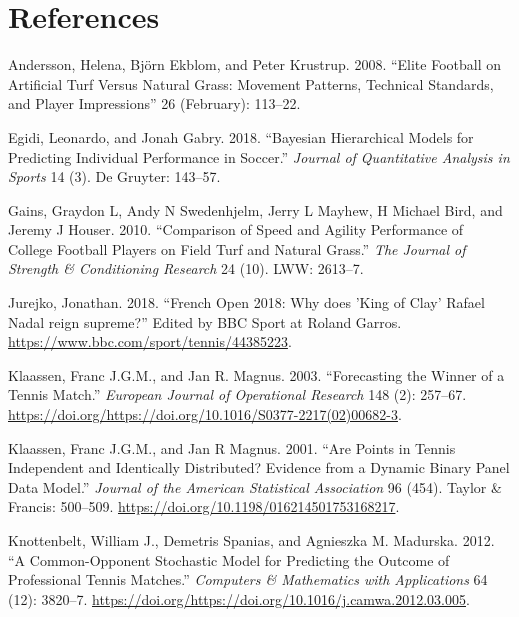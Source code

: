 \documentclass[]{article}
\begin{document}
\hypertarget{sec:refs}{%
\section*{References}\label{sec:refs}}

\hypertarget{refs}{}
\leavevmode\hypertarget{ref-andersson2008}{}%
Andersson, Helena, Björn Ekblom, and Peter Krustrup. 2008. ``Elite
Football on Artificial Turf Versus Natural Grass: Movement Patterns,
Technical Standards, and Player Impressions'' 26 (February): 113--22.

\leavevmode\hypertarget{ref-egidi2018}{}%
Egidi, Leonardo, and Jonah Gabry. 2018. ``Bayesian Hierarchical Models
for Predicting Individual Performance in Soccer.'' \emph{Journal of
Quantitative Analysis in Sports} 14 (3). De Gruyter: 143--57.

\leavevmode\hypertarget{ref-gains2010}{}%
Gains, Graydon L, Andy N Swedenhjelm, Jerry L Mayhew, H Michael Bird,
and Jeremy J Houser. 2010. ``Comparison of Speed and Agility Performance
of College Football Players on Field Turf and Natural Grass.'' \emph{The
Journal of Strength \& Conditioning Research} 24 (10). LWW: 2613--7.

\leavevmode\hypertarget{ref-bbc2018}{}%
Jurejko, Jonathan. 2018. ``French Open 2018: Why does 'King of Clay'
Rafael Nadal reign supreme?'' Edited by BBC Sport at Roland Garros.
\url{https://www.bbc.com/sport/tennis/44385223}.

\leavevmode\hypertarget{ref-klaassen2003}{}%
Klaassen, Franc J.G.M., and Jan R. Magnus. 2003. ``Forecasting the
Winner of a Tennis Match.'' \emph{European Journal of Operational
Research} 148 (2): 257--67.
\url{https://doi.org/https://doi.org/10.1016/S0377-2217(02)00682-3}.

\leavevmode\hypertarget{ref-klaassen2001}{}%
Klaassen, Franc J.G.M., and Jan R Magnus. 2001. ``Are Points in Tennis
Independent and Identically Distributed? Evidence from a Dynamic Binary
Panel Data Model.'' \emph{Journal of the American Statistical
Association} 96 (454). Taylor \& Francis: 500--509.
\url{https://doi.org/10.1198/016214501753168217}.

\leavevmode\hypertarget{ref-knottenbelt2012}{}%
Knottenbelt, William J., Demetris Spanias, and Agnieszka M. Madurska.
2012. ``A Common-Opponent Stochastic Model for Predicting the Outcome of
Professional Tennis Matches.'' \emph{Computers \& Mathematics with
Applications} 64 (12): 3820--7.
\url{https://doi.org/https://doi.org/10.1016/j.camwa.2012.03.005}.
\end{document}
